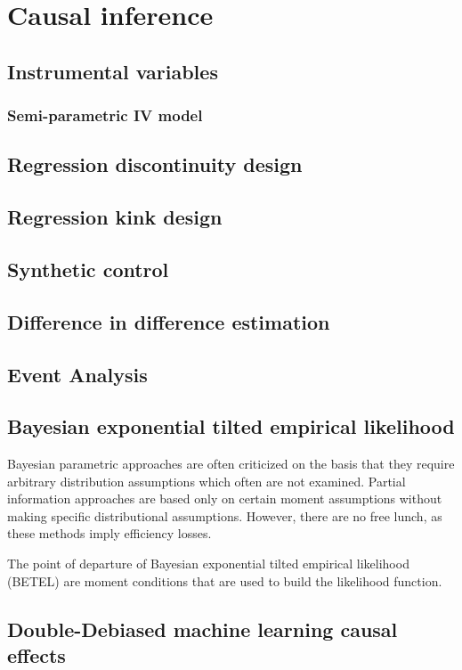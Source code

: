 \chapter{Causal inference}\label{chap12}

\section{Instrumental variables}\label{sec12_1}
\subsection{Semi-parametric IV model}\label{sec12_11}

\section{Regression discontinuity design}\label{sec12_2}

\section{Regression kink design}\label{sec12_3}

\section{Synthetic control}\label{sec12_4}

\section{Difference in difference estimation}\label{sec12_5}

\section{Event Analysis}\label{sec12_6}

\section{Bayesian exponential tilted empirical likelihood}\label{sec12_7}
Bayesian parametric approaches are often criticized on the basis that they require arbitrary distribution assumptions which often are not examined. Partial information approaches are based only on certain moment assumptions without making specific distributional assumptions. However, there are no free lunch, as these methods imply efficiency losses.

The point of departure of Bayesian exponential tilted empirical likelihood (BETEL) are moment conditions that are used to build the likelihood function.

\section{Double-Debiased machine learning causal effects}\label{sec12_8}
